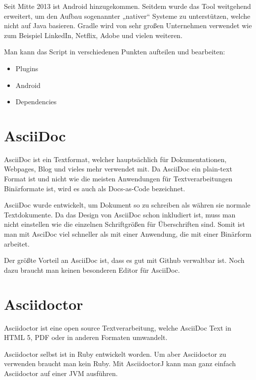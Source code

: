 Seit Mitte 2013 ist Android hinzugekommen. Seitdem wurde das Tool weitgehend erweitert, um den Aufbau sogenannter „nativer“ Systeme zu unterstützen, welche nicht auf Java basieren.
Gradle wird von sehr großen Unternehmen verwendet wie zum Beispiel LinkedIn, Netflix, Adobe und vielen weiteren.

Man kann das Script in verschiedenen Punkten aufteilen und bearbeiten:
\begin{itemize}
    \item Plugins
    \item Android
    \item Dependencies
\end{itemize}





\pagebreak



\section{AsciiDoc}
\author{David Ignjatovic}

AsciiDoc ist ein Textformat, welcher hauptsächlich für Dokumentationen, Webpages, Blog und vieles mehr verwendet mit.
Da AsciiDoc ein plain-text Format ist und nicht wie die meisten Anwendungen für Textverarbeitungen Binärformate ist, wird es auch als Docs-as-Code bezeichnet.

AsciiDoc wurde entwickelt, um Dokument so zu schreiben als währen sie normale Textdokumente. Da das Design von AsciiDoc schon inkludiert ist,
muss man nicht einstellen wie die einzelnen Schriftgrößen für Überschriften sind. Somit ist man mit AsciDoc viel schneller als mit einer Anwendung,
die mit einer Binärform arbeitet.

Der größte Vorteil an AsciiDoc ist, dass es gut mit Github verwaltbar ist. Noch dazu braucht man keinen besonderen Editor für AsciiDoc. 

\section{Asciidoctor}
\author{David Ignjatovic}

Asciidoctor ist eine open source Textverarbeitung, welche AsciiDoc Text in HTML 5, PDF oder in anderen Formaten umwandelt.

Asciidoctor selbst ist in Ruby entwickelt worden. Um aber Asciidoctor zu verwenden braucht man kein Ruby. Mit AsciidoctorJ
kann man ganz einfach Asciidoctor auf einer JVM ausführen.

